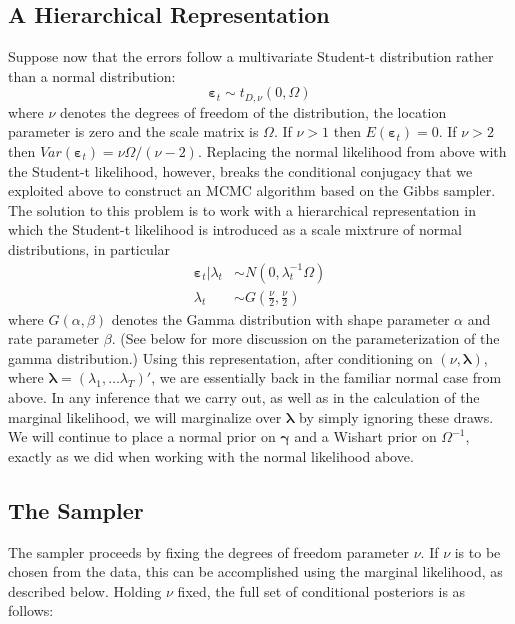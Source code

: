 \documentclass[12pt]{article}
\begin{document}
\subsection{A Hierarchical Representation}
Suppose now that the errors follow a multivariate Student-t distribution rather than a normal distribution: 
\begin{equation*}
  \boldsymbol{\varepsilon}_{t}\sim t_{D,\nu }\left( 0,\Omega \right)
\end{equation*}
where $\nu$ denotes the degrees of freedom of the distribution, the location parameter is zero and the scale matrix is $\Omega$.
If $\nu >1$ then $E(\boldsymbol{\varepsilon}_{t}) = 0$. 
If $\nu>2$ then $Var\left( \boldsymbol{\varepsilon}_{t} \right) = \nu \Omega/(\nu-2)$.
Replacing the normal likelihood from above with the Student-t likelihood, however, breaks the conditional conjugacy that we exploited above to construct an MCMC algorithm based on the Gibbs sampler.
The solution to this problem is to work with a hierarchical representation in which the Student-t likelihood is introduced as a scale mixtrure of normal distributions, in particular
\begin{align*}
  \boldsymbol{\varepsilon}_{t}|\lambda _{t} &\sim N\left( 0,\lambda _{t}^{-1}\Omega \right)
\\
\lambda _{t} &\sim G\left( \frac{\nu }{2},\frac{\nu }{2}\right)
\end{align*}
where $G(\alpha,\beta)$ denotes the Gamma distribution with shape parameter $\alpha$ and rate parameter $\beta$.
(See below for more discussion on the parameterization of the gamma distribution.)
Using this representation, after conditioning on $\left( \nu, \boldsymbol{\lambda} \right)$, where $\boldsymbol{\lambda} = (\lambda_1, \dots \lambda_T)'$, we are essentially back in the familiar normal case from above.
In any inference that we carry out, as well as in the calculation of the marginal likelihood, we will marginalize over $\boldsymbol{\lambda}$ by simply ignoring these draws.
We will continue to place a normal prior on $\boldsymbol{\gamma}$ and a Wishart prior on $\Omega^{-1}$, exactly as we did when working with the normal likelihood above.

\subsection{The Sampler}
The sampler proceeds by fixing the degrees of freedom parameter $\nu$.
If $\nu$ is to be chosen from the data, this can be accomplished using the marginal likelihood, as described below.
Holding $\nu$ fixed, the full set of conditional posteriors is as follows:
\end{document}
